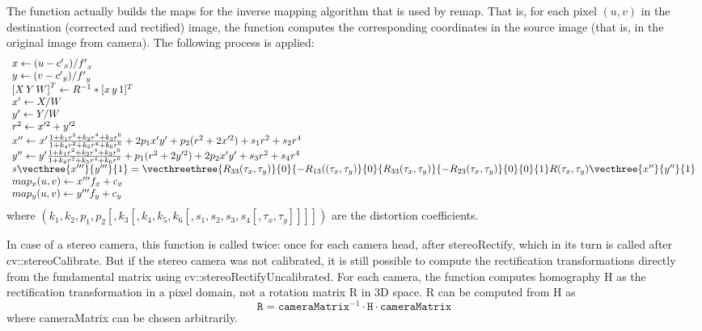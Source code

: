 The function actually builds the maps for the inverse mapping algorithm that is used by remap. That is, for each pixel $(u, v)$ in the destination (corrected and rectified) image, the function computes the corresponding coordinates in the source image (that is, in the original image from camera). The following process is applied\+: \[ \begin{array}{l} x \leftarrow (u - {c'}_x)/{f'}_x \\ y \leftarrow (v - {c'}_y)/{f'}_y \\ {[X\,Y\,W]} ^T \leftarrow R^{-1}*[x \, y \, 1]^T \\ x' \leftarrow X/W \\ y' \leftarrow Y/W \\ r^2 \leftarrow x'^2 + y'^2 \\ x'' \leftarrow x' \frac{1 + k_1 r^2 + k_2 r^4 + k_3 r^6}{1 + k_4 r^2 + k_5 r^4 + k_6 r^6} + 2p_1 x' y' + p_2(r^2 + 2 x'^2) + s_1 r^2 + s_2 r^4\\ y'' \leftarrow y' \frac{1 + k_1 r^2 + k_2 r^4 + k_3 r^6}{1 + k_4 r^2 + k_5 r^4 + k_6 r^6} + p_1 (r^2 + 2 y'^2) + 2 p_2 x' y' + s_3 r^2 + s_4 r^4 \\ s\vecthree{x'''}{y'''}{1} = \vecthreethree{R_{33}(\tau_x, \tau_y)}{0}{-R_{13}((\tau_x, \tau_y)} {0}{R_{33}(\tau_x, \tau_y)}{-R_{23}(\tau_x, \tau_y)} {0}{0}{1} R(\tau_x, \tau_y) \vecthree{x''}{y''}{1}\\ map_x(u,v) \leftarrow x''' f_x + c_x \\ map_y(u,v) \leftarrow y''' f_y + c_y \end{array} \] where $(k_1, k_2, p_1, p_2[, k_3[, k_4, k_5, k_6[, s_1, s_2, s_3, s_4[, \tau_x, \tau_y]]]])$ are the distortion coefficients. 

In case of a stereo camera, this function is called twice\+: once for each camera head, after stereo\+Rectify, which in its turn is called after cv\+::stereo\+Calibrate. But if the stereo camera was not calibrated, it is still possible to compute the rectification transformations directly from the fundamental matrix using cv\+::stereo\+Rectify\+Uncalibrated. For each camera, the function computes homography H as the rectification transformation in a pixel domain, not a rotation matrix R in 3D space. R can be computed from H as \[\texttt{R} = \texttt{cameraMatrix} ^{-1} \cdot \texttt{H} \cdot \texttt{cameraMatrix}\] where camera\+Matrix can be chosen arbitrarily. 


